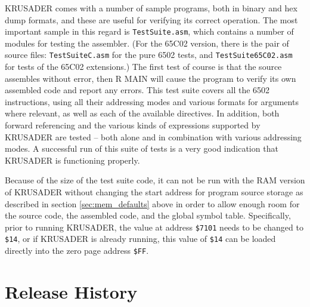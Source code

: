 \documentclass[12pt]{article}
\newcommand{\replica}[1]{\textsf{#1}}
\newcommand{\krusader}{\textsf{KRUSADER}\xspace}
\begin{document}
\krusader comes with a number of sample programs, both in binary and hex dump formats,
and these are useful for verifying its correct operation.  The most important sample in this regard
is \texttt{TestSuite.asm}, which contains a number of modules for testing the
assembler.  (For the 65C02 version, there is the pair of source files:
\texttt{TestSuiteC.asm} for the pure 6502 tests, and \texttt{TestSuite65C02.asm} for tests of the 65C02 extensions.)
The first test of course is that the source assembles without error, 
then \replica{R MAIN} will cause the program to verify its own assembled code and report any errors.
This test suite covers all the 6502 instructions, using all their addressing 
modes and various formats for arguments where relevant, as well as 
each of the available directives.  
In addition, both forward referencing and the various kinds of expressions 
supported by \krusader are tested -- both alone and in combination with various addressing modes.  A successful run of this suite of tests is a very good indication that \krusader
is functioning properly.

Because of the size of the test suite code, it can not be run with the RAM version
of \krusader without changing the start address for program source storage as
described in section \ref{sec:mem_defaults} above in order
to allow enough room for the source code, the assembled code, and the global symbol table.
Specifically, prior to running \krusader, the value at address \texttt{\$7101} needs to be changed to \texttt{\$14}, or if \krusader is already running, this value of \texttt{\$14} 
can be loaded directly into the zero page address \texttt{\$FF}.



\pagebreak
	
\section{Release History}
\label{sec:history}
\end{document}
